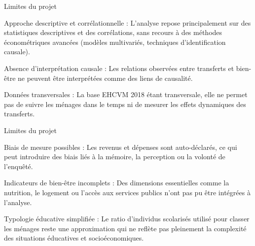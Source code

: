 \documentclass[
  11pt,
  ignorenonframetext,
]{beamer}
\begin{document}
\begin{frame}{Limites du projet}
\label{limites-du-projet-1}
\begin{block}{Approche descriptive et corrélationnelle :}
\label{approche-descriptive-et-corruxe9lationnelle}
L'analyse repose principalement sur des statistiques descriptives et des
corrélations, sans recours à des méthodes économétriques avancées
(modèles multivariés, techniques d'identification causale).
\end{block}

\begin{block}{Absence d'interprétation causale :}
\label{absence-dinterpruxe9tation-causale}
Les relations observées entre transferts et bien-être ne peuvent être
interprétées comme des liens de causalité.
\end{block}

\begin{block}{Données transversales :}
\label{donnuxe9es-transversales}
La base EHCVM 2018 étant transversale, elle ne permet pas de suivre les
ménages dans le temps ni de mesurer les effets dynamiques des
transferts.
\end{block}
\end{frame}

\begin{frame}{Limites du projet}
\label{limites-du-projet-2}
\begin{block}{Biais de mesure possibles :}
\label{biais-de-mesure-possibles}
Les revenus et dépenses sont auto-déclarés, ce qui peut introduire des
biais liés à la mémoire, la perception ou la volonté de l'enquêté.
\end{block}

\begin{block}{Indicateurs de bien-être incomplets :}
\label{indicateurs-de-bien-uxeatre-incomplets}
Des dimensions essentielles comme la nutrition, le logement ou l'accès
aux services publics n'ont pas pu être intégrées à l'analyse.
\end{block}

\begin{block}{Typologie éducative simplifiée :}
\label{typologie-uxe9ducative-simplifiuxe9e}
Le ratio d'individus scolarisés utilisé pour classer les ménages reste
une approximation qui ne reflète pas pleinement la complexité des
situations éducatives et socioéconomiques.
\end{block}
\end{frame}
\end{document}
